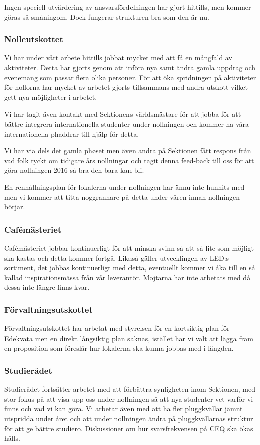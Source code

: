 \documentclass[../_main/handlingar.tex]{subfiles}
\begin{document}
Ingen speciell utvärdering av ansvarsfördelningen har gjort hittills, men kommer göras så småningom. Dock fungerar strukturen bra som den är nu.

\subsubsection*{Nolleutskottet}
Vi har under vårt arbete hittills jobbat mycket med att få en mångfald av aktiviteter. Detta har gjorts genom att införa nya samt ändra gamla uppdrag och evenemang som passar flera olika personer. För att öka spridningen på aktiviteter för nollorna har mycket av arbetet gjorts tillsammans med andra utskott vilket gett nya möjligheter i arbetet.

Vi har tagit även kontakt med Sektionens världsmästare för att jobba för att bättre integrera internationella studenter under nollningen och kommer ha våra internationella phaddrar till hjälp för detta.

Vi har via dels det gamla phøset men även andra på Sektionen fått respons från vad folk tyckt om tidigare års nollningar och tagit denna feed-back till oss för att göra nollningen 2016 så bra den bara kan bli.

En renhållningsplan för lokalerna under nollningen har ännu inte hunnits med men vi kommer att titta noggrannare på detta under våren innan nollningen börjar.

\subsubsection*{Cafémästeriet}
Cafémästeriet jobbar kontinuerligt för att minska svinn så att så lite som möjligt ska kastas och detta kommer fortgå. Likaså gäller utvecklingen av LED:s sortiment, det jobbas kontinuerligt med detta, eventuellt kommer vi åka till en så kallad inspirationsmässa från vår leverantör. Mojtarna har inte arbetats med då dessa inte längre finns kvar.

\subsubsection*{Förvaltningsutskottet}
Förvaltningsutskottet har arbetat med styrelsen för en kortsiktig plan för Edekvata men en direkt långsiktig plan saknas, istället har vi valt att lägga fram en proposition som föreslår hur lokalerna ska kunna jobbas med i längden.

\subsubsection*{Studierådet}
Studierådet fortsätter arbetet med att förbättra synligheten inom Sektionen, med stor fokus på att visa upp oss under nollningen så att nya studenter vet varför vi finns och vad vi kan göra. Vi arbetar även med att ha fler pluggkvällar jämnt utspridda under året och att under nollningen ändra på pluggkvällarnas struktur för att ge bättre studiero. Diskussioner om hur svarsfrekvensen på CEQ ska ökas hålls.
\end{document}
